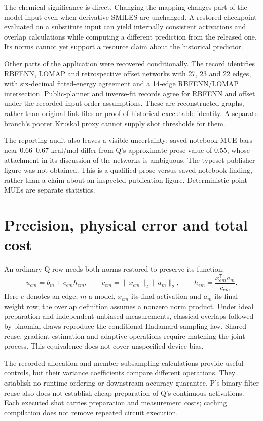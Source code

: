 \documentclass{article}
\begin{document}
The chemical significance is direct. Changing the mapping changes part of the model input even when derivative SMILES are unchanged. A restored checkpoint evaluated on a substitute input can yield internally consistent activations and overlap calculations while computing a different prediction from the released one. Its norms cannot yet support a resource claim about the historical predictor.

Other parts of the application were recovered conditionally. The record identifies RBFENN, LOMAP and retrospective offset networks with 27, 23 and 22 edges, with six-decimal fitted-energy agreement and a 14-edge RBFENN/LOMAP intersection. Public-planner and inverse-fit records agree for RBFENN and offset under the recorded input-order assumptions. These are reconstructed graphs, rather than original link files or proof of historical executable identity. A separate branch's poorer Kruskal proxy cannot supply shot thresholds for them.

The reporting audit also leaves a visible uncertainty: saved-notebook MUE bars near 0.66--0.67 kcal/mol differ from Q's approximate prose value of 0.55, whose attachment in its discussion of the networks is ambiguous. The typeset publisher figure was not obtained. This is a qualified prose-versus-saved-notebook finding, rather than a claim about an inspected publication figure. Deterministic point MUEs are separate statistics.

\section{Precision, physical error and total cost}

An ordinary Q row needs both norms restored to preserve its function:
\[
u_{em}=b_m+c_{em}h_{em},\qquad
c_{em}=\|x_{em}\|_2\|a_m\|_2,\qquad
h_{em}=\frac{x_{em}^{\mathsf T}a_m}{c_{em}}.
\]
Here \(e\) denotes an edge, \(m\) a model, \(x_{em}\) its final activation and \(a_m\) its final weight row; the overlap definition assumes a nonzero norm product. Under ideal preparation and independent unbiased measurements, classical overlaps followed by binomial draws reproduce the conditional Hadamard sampling law. Shared reuse, gradient estimation and adaptive operations require matching the joint process. This equivalence does not cover unspecified device bias.

The recorded allocation and member-subsampling calculations provide useful controls, but their variance coefficients compare different operations. They establish no runtime ordering or downstream accuracy guarantee. P's binary-filter reuse also does not establish cheap preparation of Q's continuous activations. Each executed shot carries preparation and measurement costs; caching compilation does not remove repeated circuit execution.
\end{document}
